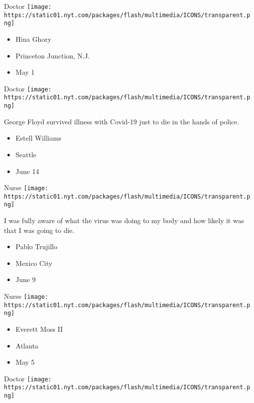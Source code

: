 \protect\hyperlink{item-hina-ghory}{}

Doctor
\texttt{[image: https://static01.nyt.com/packages/flash/multimedia/ICONS/transparent.png]}

\begin{itemize}
\tightlist
\item
  Hina Ghory
\item
  Princeton Junction, N.J.
\item
  May 1
\end{itemize}

\protect\hyperlink{item-estell-williams}{}

Doctor
\texttt{[image: https://static01.nyt.com/packages/flash/multimedia/ICONS/transparent.png]}

George Floyd survived illness with Covid-19 just to die in the hands of
police.

\begin{itemize}
\tightlist
\item
  Estell Williams
\item
  Seattle
\item
  June 14
\end{itemize}

\protect\hyperlink{item-pablo-trujillo}{}

Nurse
\texttt{[image: https://static01.nyt.com/packages/flash/multimedia/ICONS/transparent.png]}

I was fully aware of what the virus was doing to my body and how likely
it was that I was going to die.

\begin{itemize}
\tightlist
\item
  Pablo Trujillo
\item
  Mexico City
\item
  June 9
\end{itemize}

\protect\hyperlink{item-everett-moss-ii}{}

Nurse
\texttt{[image: https://static01.nyt.com/packages/flash/multimedia/ICONS/transparent.png]}

\begin{itemize}
\tightlist
\item
  Everett Moss II
\item
  Atlanta
\item
  May 5
\end{itemize}

\protect\hyperlink{item-louai-razzouk}{}

Doctor
\texttt{[image: https://static01.nyt.com/packages/flash/multimedia/ICONS/transparent.png]}

